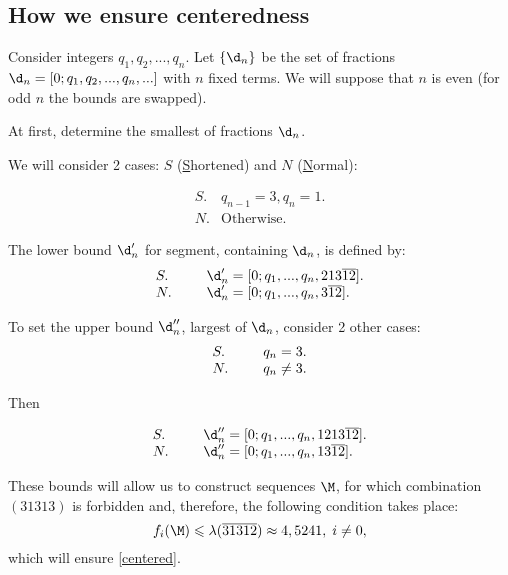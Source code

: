 \subsection{How we ensure centeredness}
\label{sbsc:boundaries_nonformal}

Consider integers $q_1, q_2, ..., q_n$.
Let $\{\d_n\}$ be the set of fractions
$\d_n = [0; q_1, q_2, ..., q_n, ...]$ with $n$ fixed terms.
We will suppose that $n$ is even (for odd $n$ the bounds are swapped).

At first, determine the smallest of fractions $\d_n$.

We will consider 2 cases: $S$
(\underline{S}hortened) and $N$ (\underline{N}ormal):

\begin{equation}
	\label{left_shortened_normal}
	\begin{array}{ll}
		S. & q_{n-1} = 3, q_n = 1. \\
		N. & \text{Otherwise.}
	\end{array}
\end{equation}

The lower bound $\d_n'$ for segment, containing $\d_n$, is defined by:
\begin{equation}
	\begin{array}{ll}
		S. & \hspace*{15pt} \d_n' = [0; q_1, ..., q_n, 213\overline{12}]. \\
		N. & \hspace*{15pt} \d_n' = [0; q_1, ..., q_n, 3\overline{12}].
	\end{array}
\end{equation}

To set the upper bound $\d_n''$, largest of $\d_n$, consider 2 other cases:
\begin{equation}
	\begin{array}{ll}
		S. & \hspace*{15pt} q_{n} = 3.\\
		N. & \hspace*{15pt} q_{n} \ne 3.
	\end{array}
\end{equation}

Then

\begin{equation}
	\begin{array}{ll}
		S. & \hspace*{15pt} \d_n'' = [0; q_1, ..., q_n, 1213\overline{12}]. \\
		N. & \hspace*{15pt} \d_n'' = [0; q_1, ..., q_n, 13\overline{12}].
	\end{array}
\end{equation}

These bounds will allow us to construct sequences $\M$,
for which combination $(31313)$ is forbidden and, therefore,
the following condition takes place:
\begin{equation}
	f_i(\M) \leqslant \lambda(\overline{31312}) \approx 4,5241, \;
	i \ne 0,
\end{equation}
which will ensure \ref{centered}.
